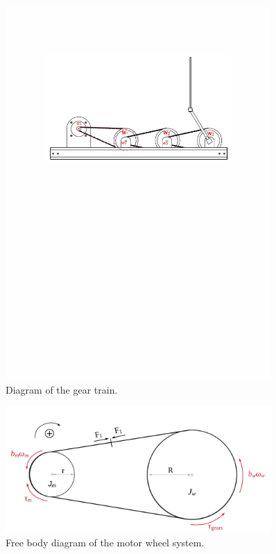 \begin{figure}[htbp]
	\centering
	\includegraphics[width=0.9\textwidth]{figures/modeling/gearTrain/LabelledWheels.pdf}
	\caption{Diagram of the gear train.}
	\label{fig:LabelledWheels}
\end{figure}

\begin{figure}[htbp]
	\centering
	\includegraphics[width=0.9\textwidth]{figures/modeling/gearTrain/GearAndBeltSystem.pdf}
	\caption{Free body diagram of the motor wheel system.}
	\label{fig:Belt&Pulley}
\end{figure}

